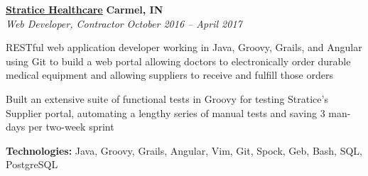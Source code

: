 %
    \headerrow
        {\textbf{\href{https://www.straticehealthcare.com/}{Stratice Healthcare}}}
        {\textbf{Carmel, IN}}
    \\
    \headerrow
        {\emph{Web Developer, Contractor}}
        {\emph{October 2016 -- April 2017}}
    \begin{itemize*}
        \item RESTful web application developer working in Java, Groovy, Grails, and Angular
                using Git to build a web portal allowing doctors to electronically order durable medical equipment and
                allowing suppliers to receive and fulfill those orders
        \item Built an extensive suite of functional tests in Groovy for testing Stratice's Supplier portal, automating
                a lengthy series of manual tests and saving 3 man-days per two-week sprint
    \end{itemize*}

    \hspace{1.0em}
        {\textbf{Technologies:} Java, Groovy, Grails, Angular, Vim, Git, Spock, Geb, Bash, SQL, PostgreSQL}
